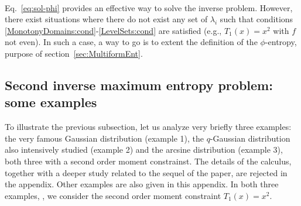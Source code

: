 \documentclass[english,sort&compress]{elsarticle}
\theoremstyle{definition}
\theoremstyle{plain}
\theoremstyle{plain}
\begin{document}
\

Eq.~\eqref{eq:sol-phi}  provides   an  effective   way  to  solve   the  inverse
problem. However,  there exist situations  where there do  not exist any  set of
$\lambda_i$ such that conditions \ref{MonotonyDomains:cond}-\ref{LevelSets:cond}
are satisfied (e.g., $T_1(x)  = x^2$ with $f$ not even).  In such  a case, a way
to  go  is   to  extent  the  definition  of  the   $\phi$-entropy,  purpose  of
section~\ref{sec:MultiformEnt}.



\subsection{Second inverse maximum entropy problem: some examples}

To  illustrate  the previous  subsection,  let  us  analyze very  briefly  three
examples: the  very famous Gaussian  distribution (example 1),  the $q$-Gaussian
distribution also intensively  studied (example 2) and  the arcsine distribution
(example  3),  both three  with  a  second  order moment  constrainst.     The  details of the  calculus, together with  a deeper
study related to the  sequel of the paper, are rejected  in the appendix.  Other
examples are also given in this  appendix. In both three examples, , we consider the  second order moment constraint  $T_1(x) =
x^2$.
\end{document}
